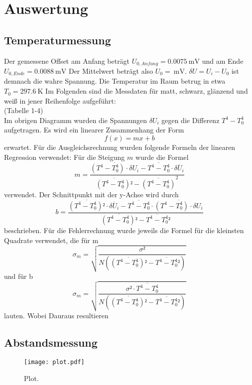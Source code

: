 \section{Auswertung}
\label{sec:Auswertung}

\subsection{Temperaturmessung}
Der gemessene Offset am Anfang beträgt $U_{0,Anfang} = \SI{0,0075}{\milli\volt}$ und am Ende $U_{0,Ende} = \SI{0,0088}{\milli\volt}$
Der Mittelwert beträgt also $U_0 = \SI{}{\milli\volt}$.
$\delta U = U_i - U_0$ ist demnach die wahre Spannung.
Die Temperatur im Raum betrug in etwa $T_0 = \SI{297,6}{\kelvin}$
Im Folgenden sind die Messdaten für matt, schwarz, glänzend und weiß in jener Reihenfolge aufgeführt:
\\
(Tabelle 1-4)
\\
Im obrigen Diagramm wurden die Spannungen $\delta U_i$ gegen die Differenz $T^4 - T_0^4$ aufgetragen.
Es wird ein linearer Zusammenhang der Form
\begin{equation}
  f(x) = mx + b
\end{equation}
erwartet.
Für die Ausgleichsrechnung wurden folgende Formeln der linearen Regression verwendet:
Für die Steigung $m$ wurde die Formel
\begin{equation}
  m = \frac{\overline{(T^4 - T_0^4) \cdot \delta U_i}-\overline{T^4 - T_0^4}\cdot \overline{\delta U_i}}{\overline{(T^4 - T_0^4)²}-\overline{(T^4 - T_0^4)}^2}
\end{equation}
verwendet. Der Schnittpunkt mit der y-Achse wird durch
\begin{equation}
  b = \frac{\overline{(T^4 - T_0^4)²} \cdot \overline{\delta U_i}- \overline{T^4 - T_0^4} \cdot \overline{(T^4 - T_0^4)\cdot \delta U_i}}{\overline{(T^4 - T_0^4)²}-\overline{T^4 - T_0^4}²}
\end{equation}
beschrieben.
Für die Fehlerrechnung wurde jeweils die Formel für die kleinsten Quadrate verwendet, die für m
\begin{equation}
  \sigma_m = \sqrt{\frac{\sigma²}{N(\overline{(T^4 - T_0^4)²}-\overline{T^4 - T_0^4}²)}}
\end{equation}
und für b
\begin{equation}
  \sigma_m = \sqrt{\frac{\sigma² \cdot \overline{T^4 - T_0^4}}{N(\overline{(T^4 - T_0^4)²}-\overline{T^4 - T_0^4}²)}}
\end{equation}
lauten. Wobei 
Dauraus resultieren
\subsection{Abstandsmessung}


\begin{figure}
  \centering
  \texttt{[image: plot.pdf]}
  \caption{Plot.}
  \label{fig:plot}
\end{figure}
